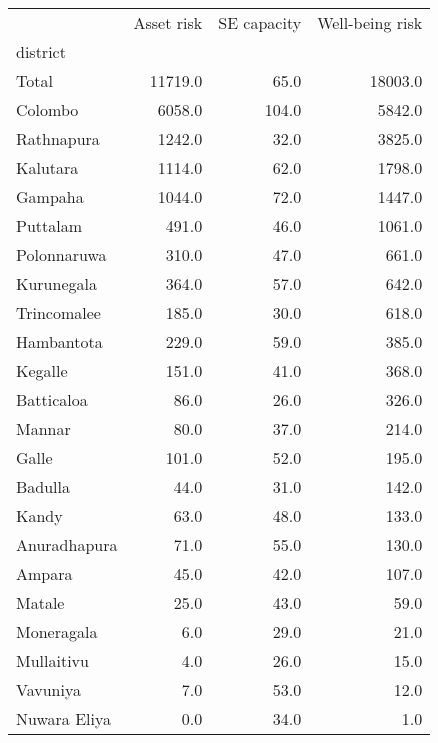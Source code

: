\begin{tabular}{lrrr}
\toprule
{} &  Asset risk &  SE capacity &  Well-being risk \\
district     &             &              &                  \\
\midrule
Total        &     11719.0 &         65.0 &          18003.0 \\
Colombo      &      6058.0 &        104.0 &           5842.0 \\
Rathnapura   &      1242.0 &         32.0 &           3825.0 \\
Kalutara     &      1114.0 &         62.0 &           1798.0 \\
Gampaha      &      1044.0 &         72.0 &           1447.0 \\
Puttalam     &       491.0 &         46.0 &           1061.0 \\
Polonnaruwa  &       310.0 &         47.0 &            661.0 \\
Kurunegala   &       364.0 &         57.0 &            642.0 \\
Trincomalee  &       185.0 &         30.0 &            618.0 \\
Hambantota   &       229.0 &         59.0 &            385.0 \\
Kegalle      &       151.0 &         41.0 &            368.0 \\
Batticaloa   &        86.0 &         26.0 &            326.0 \\
Mannar       &        80.0 &         37.0 &            214.0 \\
Galle        &       101.0 &         52.0 &            195.0 \\
Badulla      &        44.0 &         31.0 &            142.0 \\
Kandy        &        63.0 &         48.0 &            133.0 \\
Anuradhapura &        71.0 &         55.0 &            130.0 \\
Ampara       &        45.0 &         42.0 &            107.0 \\
Matale       &        25.0 &         43.0 &             59.0 \\
Moneragala   &         6.0 &         29.0 &             21.0 \\
Mullaitivu   &         4.0 &         26.0 &             15.0 \\
Vavuniya     &         7.0 &         53.0 &             12.0 \\
Nuwara Eliya &         0.0 &         34.0 &              1.0 \\
\bottomrule
\end{tabular}
